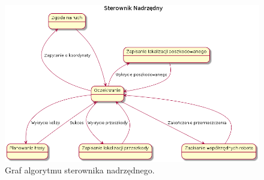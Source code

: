 \begin{figure}[H]
    \centering
    \includegraphics[width=1\textwidth]{gggg.png}
    \caption{Graf algorytmu sterownika nadrzędnego.}
    \label{fig:tiled}
\end{figure}
